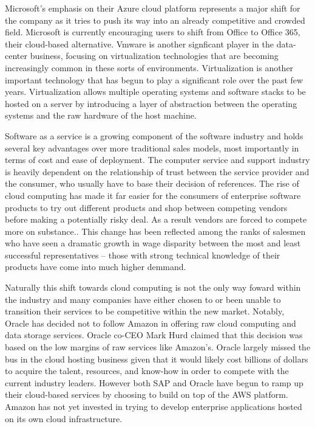 Microsoft's emphasis on their Azure cloud platform represents a major shift for the company as it tries to push its way into an already competitive and crowded field.\autocite[]{OptimismInnovation}
Microsoft is currently encouraging users to shift from Office  to Office 365, their cloud-based alternative.\autocite[]{NextGenBusinessSoftware}
Vmware is another signficant player in the data-center business, focusing on virtualization technologies that are becoming increasingly common in these sorts of environments.\autocite[]{NextGenBusinessSoftware}
Virtualization is another important technology that has begun to play a significant role over the past few years.\autocite[]{LargeParadigmShiftCloudComputing}
Virtualization allows multiple operating systems and software stacks to be hosted on a server by introducing a layer of abstraction between the operating systems and the raw hardware of the host machine.\autocite[]{LargeParadigmShiftCloudComputing}

Software as a service is a growing component of the software industry and holds several key advantages over more traditional sales models, most importantly in terms of cost and ease of deployment.\autocite[]{GrowthTrendsSoftwareService}\autocite[]{TransitionPhaseEnterpriseApplication}
The computer service and support industry is heavily dependent on the relationship of trust between the service provider and the consumer, who usually have to base their decision of references.\autocite[9]{buxmann2012software}
The rise of cloud computing has made it far easier for the consumers of enterprise software products to try out different products and shop between competing vendors before making a potentially risky deal.\autocite[29]{LiquidLunch}
As a result vendors are forced to compete more on substance.\autocite[29]{LiquidLunch}.
This change has been reflected among the ranks of salesmen who have seen a dramatic growth in wage disparity between the most and least successful representatives -- those with strong technical knowledge of their products have come into much higher demmand.\autocite[30]{LiquidLunch}

Naturally this shift towards cloud computing is not the only way foward within the industry and many companies have either chosen to or been unable to transition their services to be competitive within the new market.
Notably, Oracle has decided not to follow Amazon in offering raw cloud computing and data storage services.
Oracle co-CEO Mark Hurd claimed that this decision was based on the low margins of raw services like Amazon's.\autocite[]{OracleCloudNotAWS}
Oracle largely missed the bus in the cloud hosting business given that it would likely cost billions of dollars to acquire the talent, resources, and know-how in order to compete with the current industry leaders.\autocite[]{OracleCloudNotAWS}
However both SAP and Oracle have begun to ramp up their cloud-based services by choosing to build on top of the AWS platform.\autocite[]{OracleCloudNotAWS}
Amazon has not yet invested in trying to develop enterprise applications hosted on its own cloud infrastructure.


